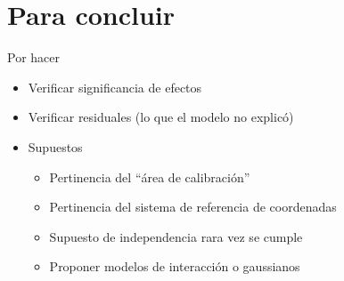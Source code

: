 \documentclass[
  11pt,
  ignorenonframetext,
]{beamer}
\providecommand{\tightlist}{%
  \setlength{\itemsep}{0pt}\setlength{\parskip}{0pt}}
\begin{document}
\hypertarget{para-concluir}{%
\section{Para concluir}\label{para-concluir}}

\begin{frame}{Por hacer}
\protect\hypertarget{por-hacer}{}
\begin{itemize}
\item
  Verificar significancia de efectos
\item
  Verificar residuales (lo que el modelo no explicó)
\item
  Supuestos

  \begin{itemize}
  \tightlist
  \item
    Pertinencia del ``área de calibración''
  \item
    Pertinencia del sistema de referencia de coordenadas
  \item
    Supuesto de independencia rara vez se cumple
  \item
    Proponer modelos de interacción o gaussianos
  \end{itemize}
\end{itemize}
\end{frame}
\end{document}
